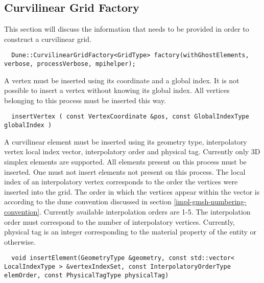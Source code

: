 \subsection{Curvilinear Grid Factory}
\label{interface-grid-factory}

This section will discuss the information that needs to be provided in order to construct a curvilinear grid. \\

\begin{mybox}
\begin{lstlisting}
  Dune::CurvilinearGridFactory<GridType> factory(withGhostElements, verbose, processVerbose, mpihelper);
\end{lstlisting}
\end{mybox}

\noindent
A vertex must be inserted using its coordinate and a global index. It is not possible to insert a vertex without knowing its global index. All vertices belonging to this process must be inserted this way. \\

\begin{mybox}
\begin{lstlisting}
  insertVertex ( const VertexCoordinate &pos, const GlobalIndexType globalIndex )
\end{lstlisting}
\end{mybox}

\noindent
A curvilinear element must be inserted using its geometry type, interpolatory vertex local index vector, interpolatory order and physical tag. Currently only 3D simplex elements are supported. All elements present on this process must be inserted. One must not insert elements not present on this process. The local index of an interpolatory vertex corresponds to the order the vertices were inserted into the grid. The order in which the vertices appear within the vector is according to the dune convention discussed in section \ref{impl-gmsh-numbering-convention}. Currently available interpolation orders are 1-5. The interpolation order must correspond to the number of interpolatory vertices. Currently, physical tag is an integer corresponding to the material property of the entity or otherwise.   \\

\begin{mybox}
\begin{lstlisting}
  void insertElement(GeometryType &geometry, const std::vector< LocalIndexType > &vertexIndexSet, const InterpolatoryOrderType elemOrder, const PhysicalTagType physicalTag)
\end{lstlisting}
\end{mybox}


